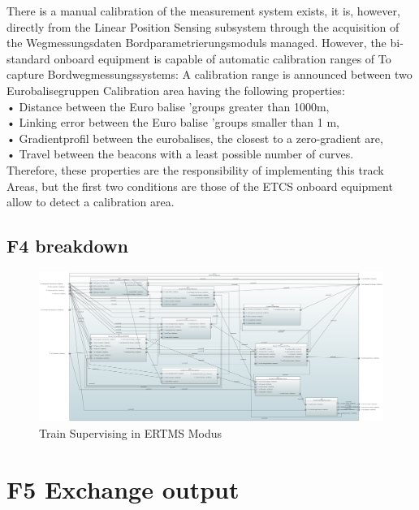 \documentclass{template/openetcs_report}
\begin{document}
There is a manual calibration of the measurement system exists, it is, however, directly from the 
Linear Position Sensing subsystem through the acquisition of the Wegmessungsdaten 
Bordparametrierungsmoduls managed. 
However, the bi-standard onboard equipment is capable of automatic calibration ranges of 
To capture Bordwegmessungssystems: 
A calibration range is announced between two Eurobalisegruppen 
Calibration area having the following properties: \\
     • Distance between the Euro balise 'groups greater than 1000m, \\
     • Linking error between the Euro balise 'groups smaller than 1 m, \\
     • Gradientprofil between the eurobalises, the closest to a zero-gradient 
         are, \\
     • Travel between the beacons with a least possible number of curves. \\
Therefore, these properties are the responsibility of implementing this track 
Areas, but the first two conditions are those of the ETCS onboard equipment 
allow to detect a calibration area.\\



 \subsection{F4 breakdown}	
 \begin{figure}[hbtp]
\centering
\includegraphics [angle=90, scale=0.25] {images/F4_Breakdown}
\caption{Train Supervising in ERTMS Modus}
\end{figure}

\newpage

 \section{F5 Exchange output}
\end{document}
